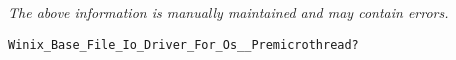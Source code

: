 \label{pkg:winix\_base\_text\_file\_io\_driver\_for\_posix\_\_premicrothread}

{\tiny \it The above information is manually maintained and may contain errors.}
\begin{verbatim}
Winix_Base_File_Io_Driver_For_Os__Premicrothread?
\end{verbatim}
